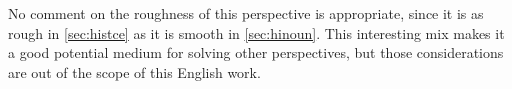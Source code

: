 No comment on the roughness of this perspective is appropriate, since it is as rough in \autoref{sec:histce} as it is  smooth in \autoref{sec:hinoun}. This interesting mix makes it a good potential medium for solving other perspectives, but those considerations are out of the scope of this English work.






